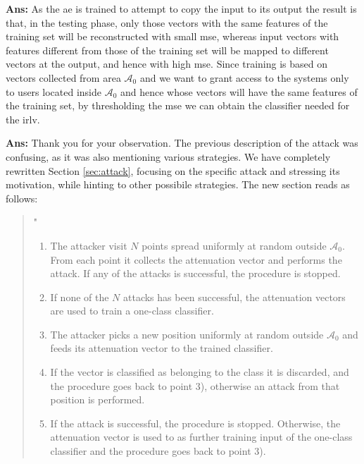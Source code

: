 \documentclass[draftcls,onecolumn,12pt]{IEEEtran}
\newcounter{revc}
\newcommand{\revp}[1]{\zref[revcontent]{#1}}
\begin{document}
{\bf Ans:} As the \ac{ae} is trained to attempt to copy the input to its output the result is that, in the testing phase, only those vectors with the same features of the training set will be reconstructed with small \ac{mse}, whereas input vectors with features different from those of the training set will be mapped to different vectors at the output, and hence with high \ac{mse}. Since training is based on vectors collected from area $\mathcal{A}_0$ and we want to grant access to the systems only to users located inside $\mathcal{A}_0$ and hence whose vectors will have the same features of the training set, by thresholding the \ac{mse} we can obtain the classifier needed for the \ac{irlv}.

\begin{framed}
\end{framed}
{\bf Ans:} Thank you for your observation. The previous description of the attack was confusing, as it was also mentioning various strategies. We have completely rewritten Section \ref{sec:attack}, focusing on the specific attack and stressing its motivation, while hinting to other possibile strategies. The new section reads as follows:
\begin{quote}
    "\revp{sezattack}
\begin{enumerate}
    \item The attacker visit  $N$  points spread uniformly at random outside $\mathcal A_0$. From each point it collects the attenuation vector and performs the attack. If any of the attacks is successful, the procedure is stopped.
    \item If none of the $N$ attacks has been successful, the attenuation vectors are used to train a one-class classifier.
    \item The attacker picks a new position uniformly at random outside $\mathcal A_0$ and feeds its attenuation vector to the trained classifier.
    \item If the vector is classified as belonging to the class it is discarded, and the procedure goes back to point 3), otherwise an attack from that position is performed.
    \item If the attack is successful, the procedure is stopped. Otherwise, the attenuation vector is used to as further training input of the one-class classifier and the procedure goes back to point 3).
\end{enumerate}
\revp{sezattack2} 
\end{quote}
\end{document}
